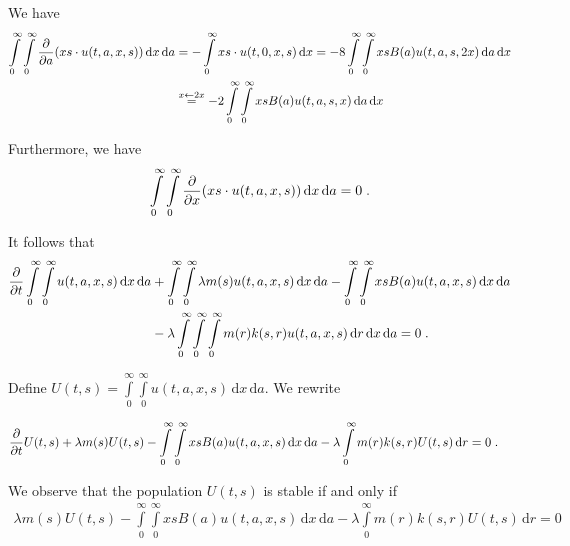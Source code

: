 \documentclass[11pt]{amsart}
\newcommand{\diff}{\,\mathrm{d}}
\begin{document}
We have
\begin{align*}
    \int\limits_0^\infty \int\limits_0^\infty \partiala(xs \cdot u(t,a,x,s)) \diff x \diff a 
    &= 
    - \int\limits_0^\infty xs \cdot u(t,0,x,s) \diff x 
    = 
    - 8 \int\limits_0^\infty \int\limits_0^\infty xs B(a) u(t,a,s,2x) \diff a \diff x \\
    &\overset{x \leftarrow 2x}{=} 
    - 2 \int\limits_0^\infty \int\limits_0^\infty xs B(a) u(t,a,s,x) \diff a \diff x
\end{align*}

Furthermore, we have
\begin{align*}
    \int\limits_0^\infty \int\limits_0^\infty \partialx(xs \cdot u(t,a,x,s)) \diff x \diff a 
    = 0
    \eqfinp
\end{align*}

It follows that 
\begin{align*}
    \partialt \int\limits_0^\infty \int\limits_0^\infty  u(t,a,x,s) \diff x \diff a
    &+ \int\limits_0^\infty \int\limits_0^\infty \lambda m(s) u(t,a,x,s) \diff x \diff a
    -  \int\limits_0^\infty \int\limits_0^\infty x s B(a) u(t,a,x,s) \diff x \diff a \\
    &
    -  \lambda \int\limits_0^\infty \int\limits_0^\infty \int\limits_0^\infty m(r) k(s,r) u(t,a,x,s) \diff r \diff x \diff a = 0
    \eqfinp
\end{align*}

Define $U(t,s) = \int\limits_0^\infty \int\limits_0^\infty  u(t,a,x,s) \diff x \diff a$. We rewrite

\begin{align*}
    \partialt U(t,s)
    &+ \lambda m(s) U(t,s)
    -  \int\limits_0^\infty \int\limits_0^\infty x s B(a) u(t,a,x,s) \diff x \diff a
    - \lambda \int\limits_0^\infty m(r) k(s,r) U(t,s) \diff r 
    = 0
    \eqfinp
\end{align*}

\begin{remark}
    We observe that the population $U(t,s)$ is stable if and only if 
    \begin{align*}
         \lambda m(s) U(t,s)
    -  \int\limits_0^\infty \int\limits_0^\infty x s B(a) u(t,a,x,s) \diff x \diff a
    - \lambda \int\limits_0^\infty m(r) k(s,r) U(t,s) \diff r = 0
    \end{align*}
\end{remark}
\end{document}

